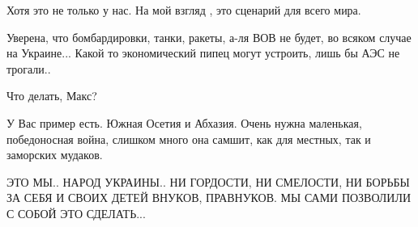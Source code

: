 \begin{itemize}
Хотя это не только у нас. На мой взгляд , это сценарий для всего мира.


Уверена, что бомбардировки, танки, ракеты, а-ля ВОВ не будет, во всяком случае
на Украине... Какой то экономический пипец могут устроить, лишь бы АЭС не
трогали..

Что делать, Макс?


У Вас пример есть. Южная Осетия и Абхазия. Очень нужна маленькая, победоносная
война, слишком много она самшит, как для местных, так и заморских мудаков.


ЭТО МЫ.. НАРОД УКРАИНЫ.. НИ ГОРДОСТИ, НИ СМЕЛОСТИ, НИ БОРЬБЫ ЗА СЕБЯ И СВОИХ ДЕТЕЙ
ВНУКОВ, ПРАВНУКОВ. МЫ САМИ ПОЗВОЛИЛИ С СОБОЙ ЭТО СДЕЛАТЬ...

\end{itemize} %
